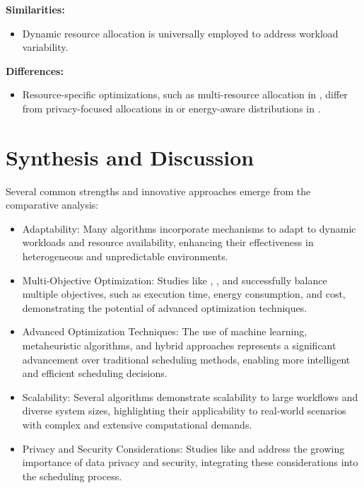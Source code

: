 \documentclass[a4paper, final]{article}
\begin{document}
\noindent \textbf{Similarities:}
\begin{itemize}
    \item Dynamic resource allocation is universally employed to address workload variability.
\end{itemize}

\noindent \textbf{Differences:}
\begin{itemize}
    \item Resource-specific optimizations, such as multi-resource allocation in \cite{bib:8}, differ 
    from privacy-focused allocations in \cite{bib:7_ppps} or energy-aware distributions in \cite{bib:5_epee}.
\end{itemize}

\section{Synthesis and Discussion}
Several common strengths and innovative approaches emerge from the comparative analysis:
\begin{itemize}
    \item Adaptability: Many algorithms incorporate mechanisms to adapt to dynamic workloads and resource availability, 
    enhancing their effectiveness in heterogeneous and unpredictable environments.

    \item Multi-Objective Optimization: Studies like \cite{bib:3_sandcat}, \cite{bib:6_marine}, and \cite{bib:10} successfully balance multiple objectives, such 
    as execution time, energy consumption, and cost, demonstrating the potential of advanced optimization techniques.
    
    \item Advanced Optimization Techniques: The use of machine learning, metaheuristic algorithms, and hybrid approaches 
    represents a significant advancement over traditional scheduling methods, enabling more intelligent and efficient 
    scheduling decisions.
    
    \item Scalability: Several algorithms demonstrate scalability to large workflows and diverse system sizes, highlighting 
    their applicability to real-world scenarios with complex and extensive computational demands.
    
    \item Privacy and Security Considerations: Studies like \cite{bib:2_faro} and \cite{bib:7_ppps} address the growing importance of data privacy and 
    security, integrating these considerations into the scheduling process.
\end{itemize}
\end{document}
